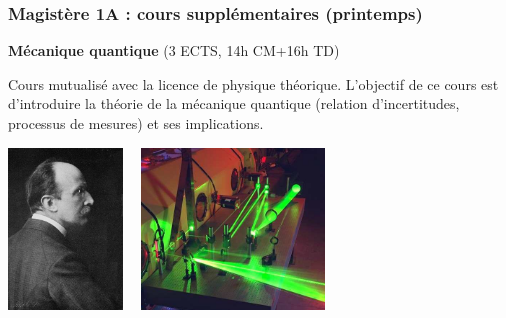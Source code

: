 \documentclass[slidetop,11pt]{beamer}
\begin{document}
\begin{frame}
\begin{center}
\end{center}

\end{frame}

\begin{frame}
\frametitle{Magistère 1A : cours supplémentaires (printemps)}

\textbf{Mécanique quantique} (3 ECTS, 14h CM+16h TD)

Cours mutualisé avec la licence de physique théorique.
L'objectif de ce cours est d'introduire la théorie de la mécanique quantique (relation d'incertitudes, processus de mesures) et ses implications. 
\begin{center}
\includegraphics[height=4.3cm]{Max_Planck_Nobel_1918.jpg}$\quad$
\includegraphics[height=4.3cm]{Laser_optique.jpg}
\end{center}
\end{frame}
\end{document}
